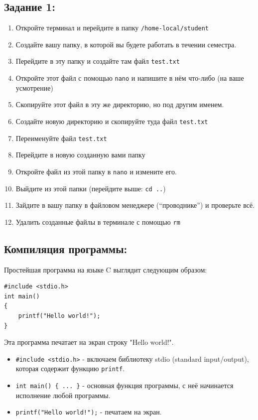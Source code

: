 \documentclass{article}
\begin{document}
\subsection*{Задание 1:}
\begin{enumerate}
\item Откройте терминал и перейдите в папку  \texttt{/home-local/student}
\item Создайте вашу папку, в которой вы будете работать в течении семестра.
\item Перейдите в эту папку и создайте там файл \texttt{test.txt}
\item Откройте этот файл с помощью \texttt{nano} и напишите в нём что-либо (на ваше усмотрение)
\item Скопируйте этот файл в эту же директорию, но под другим именем.
\item Создайте новую директорию и скопируйте туда файл \texttt{test.txt}
\item Переименуйте файл \texttt{test.txt}
\item Перейдите в новую созданную вами папку
\item Откройте файл из этой папку в \texttt{nano} и измените его.
\item Выйдите из этой папки (перейдите выше:  \texttt{cd ..})
\item Зайдите в вашу папку в файловом менеджере (``проводнике'') и проверьте всё.
\item Удалить созданные файлы в терминале с помощью \texttt{rm}
\end{enumerate}

\subsection*{Компиляция программы:}
Простейшая программа на языке C выглядит следующим образом:
\begin{lstlisting}
#include <stdio.h>
int main() 
{
    printf("Hello world!");
}
\end{lstlisting}

Эта программа печатает на экран строку "Hello world!".
\begin{itemize}
\item \texttt{\#include <stdio.h>}  - включаем библиотеку stdio (standard input/output), которая содержит функцию \texttt{printf}.
\item \texttt{int main() \{ ... \}} - основная функция программы, с неё начинается исполнение любой программы.
\item \texttt{printf("Hello world!");} - печатаем на экран.
\end{itemize}
\end{document}

